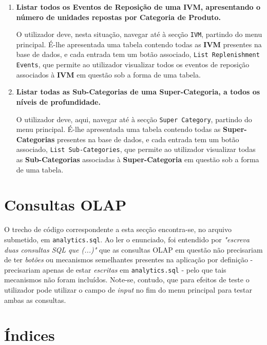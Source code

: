 \documentclass[12pt,a4paper]{article}
\begin{document}
\begin{enumerate}
    \item \textbf{Listar todos os Eventos de Reposição de uma IVM, apresentando
    o número de unidades repostas por Categoria de Produto.}

    O utilizador deve, nesta situação, navegar até à secção \texttt{IVM},
    partindo do menu principal. É-lhe apresentada uma tabela contendo todas as
    \textbf{IVM} presentes na base de dados, e cada entrada tem um botão
    associado, \texttt{List Replenishment Events}, que permite ao utilizador
    visualizar todos os eventos de reposição associados à \textbf{IVM} em questão
    sob a forma de uma tabela.
    
    \item \textbf{Listar todas as Sub-Categorias de uma Super-Categoria, a todos
    os níveis de profundidade.}

    O utilizador deve, aqui, navegar até à secção \texttt{Super Category},
    partindo do menu principal. É-lhe apresentada uma tabela contendo todas as
    \textbf{Super-Categorias} presentes na base de dados, e cada entrada tem um
    botão associado, \texttt{List Sub-Categories}, que permite ao utilizador
    visualizar todas as \textbf{Sub-Categorias} associadas à \textbf{Super-Categoria}
    em questão sob a forma de uma tabela.

  \end{enumerate}


  \section*{Consultas OLAP}

  O trecho de código correspondente a esta secção encontra-se, no arquivo submetido,
  em \texttt{analytics.sql}. Ao ler o enunciado, foi entendido por \textit{"escreva
  duas consultas SQL que (...)"} que as consultas OLAP em questão não precisariam
  de ter \textit{botões} ou mecanismos semelhantes presentes na aplicação por
  definição - precisariam apenas de estar \textit{escritas} em \texttt{analytics.sql} -
  pelo que tais mecanismos não foram incluídos. Note-se, contudo, que para efeitos de teste
  o utilizador pode utilizar o campo de \textit{input} no fim do menu principal
  para testar ambas as consultas.

  \section*{Índices}
\end{document}
